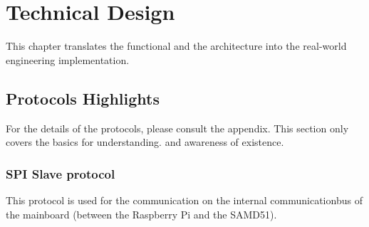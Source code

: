 \chapter{Technical Design}
This chapter translates the functional and the architecture into the real-world engineering implementation. 

\section{Protocols Highlights}
For the details of the protocols, please consult the appendix. This section only covers the basics for understanding. and awareness of existence.  \\
\subsection{SPI Slave protocol}
This protocol is used for the communication on the internal communicationbus of the mainboard (between the Raspberry Pi and the SAMD51).\\
